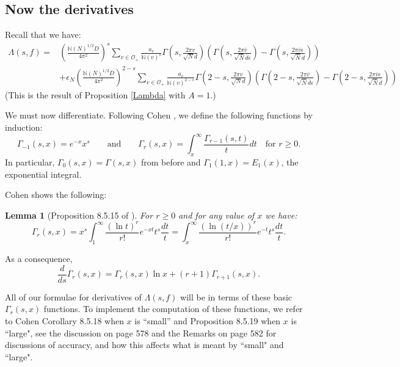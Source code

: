 \documentclass{article}
\theoremstyle{plain}
\newtheorem{lemma}{Lemma}
\begin{document}
\subsection{Now the derivatives}

Recall that we have:
\begin{equation*}
\begin{split}
\Lambda(s,f)=& \left(\frac{\mathbb{N}(N)^{1/2}D}{4\pi^2}\right)^s \sum_{v \in \mathcal{O}_+} \frac{a_v}{\mathbb{N}(v)^s} \Gamma\left(s, \frac{2\pi v }{\sqrt{N}d}\right) \left(\Gamma\left(s,\frac{2 \pi \bar{v}}{\sqrt{\bar{N}}\bar{d} \epsilon} \right)-  \Gamma\left(s,\frac{2 \pi \bar{v}\epsilon}{\sqrt{\bar{N}}\bar{d} } \right) \right) \\
&+ \epsilon_N \left(\frac{\mathbb{N}(N)^{1/2}D}{4\pi^2}\right)^{2-s}\sum_{v \in \mathcal{O}_+} \frac{a_v}{\mathbb{N}(v)^{2-s}} \Gamma\left(2-s, \frac{2\pi v }{\sqrt{N}d}\right) \left(\Gamma\left(2-s,\frac{2 \pi \bar{v}}{\sqrt{\bar{N}}\bar{d} \epsilon} \right)-  \Gamma\left(2-s,\frac{2 \pi \bar{v}\epsilon}{\sqrt{\bar{N}}\bar{d} } \right) \right)
\end{split}
\end{equation*}
(This is the result of Proposition \ref{Lambda} with $A=1$.)

We must now differentiate. Following Cohen \cite[Definition 8.5.12]{cohen}, we define the following functions by induction:
\begin{equation*}
\Gamma_{-1}(s,x)= e^{-x}x^s \qquad \text{and} \qquad \Gamma_r(s,x) = \int_x^{\infty}\frac{\Gamma_{r-1}(s,t)}{t}dt \quad \text{for } r\geq 0.
\end{equation*}
In particular, $\Gamma_0(s,x)=\Gamma(s,x)$ from before and $\Gamma_1(1,x)=E_1(x)$, the exponential integral.

Cohen shows the following:
\begin{lemma}[Proposition 8.5.15 of \cite{cohen}]
For $r \geq 0$ and for any value of $x$ we have:
\begin{equation*}
\Gamma_r(s,x)=x^s \int_1^{\infty} \frac{(\ln t)^r}{r!}e^{-xt} t^s \frac{dt}{t}=\int_x^{\infty} \frac{(\ln(t/x))^r}{r!}e^{-t}t^s \frac{dt}{t}.
\end{equation*}
\end{lemma}

As a consequence, 
\begin{equation*}
\frac{d}{ds} \Gamma_r(s,x)= \Gamma_r(s,x) \ln x +(r+1)\Gamma_{r+1}(s,x).
\end{equation*}

All of our formulae for derivatives of $\Lambda(s,f)$ will be in terms of these basic $\Gamma_r(s,x)$ functions. To implement the computation of these functions, we refer to Cohen \cite{cohen} Corollary 8.5.18 when $x$ is ``small'' and Proposition 8.5.19 when $x$ is ``large", see the discussion on page 578 and the Remarks on page 582 for discussions of accuracy, and how this affects what is meant by ``small" and ``large".
\end{document}
